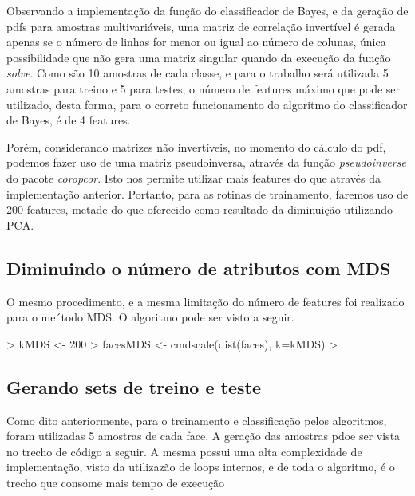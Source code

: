 \documentclass[12pt,a4paper,titlepage]{article}
\begin{document}
Observando a implementação da função do classificador de Bayes, e da geração de pdfs para amostras multivariáveis, uma matriz de correlação invertível é gerada apenas se o número de linhas for menor ou igual ao número de colunas, única possibilidade que não gera uma matriz singular quando da execução da função \textit{solve}. Como são 10 amostras de cada classe, e para o trabalho será utilizada 5 amostras para treino e 5 para testes, o número de features máximo que pode ser utilizado, desta forma, para o correto funcionamento do algoritmo do classificador de Bayes, é de 4 features.

Porém, considerando matrizes não invertíveis, no momento do cálculo do pdf, podemos fazer uso de uma matriz pseudoinversa, através da função \textit{pseudoinverse} do pacote \textit{coropcor}. Isto nos permite utilizar mais features do que através da implementação anterior. Portanto, para as rotinas de trainamento, faremos uso de 200 features, metade do que oferecido como resultado da diminuição utilizando PCA.

\subsection{Diminuindo o número de atributos com MDS}

O mesmo procedimento, e a mesma limitação do número de features foi realizado para o me´todo MDS. O algoritmo pode ser visto a seguir.

\begin{Schunk}
\begin{Sinput}
> kMDS <- 200
> facesMDS <- cmdscale(dist(faces), k=kMDS)
> 
\end{Sinput}
\end{Schunk}

\subsection{Gerando sets de treino e teste}

Como dito anteriormente, para o treinamento e classificação pelos algoritmos, foram utilizadas 5 amostras de cada face. A geração das amostras pdoe ser vista no trecho de código a seguir. A mesma possui uma alta complexidade de implementação, visto da utilizazão de loops internos, e de toda o algoritmo, é o trecho que consome mais tempo de execução
\end{document}
